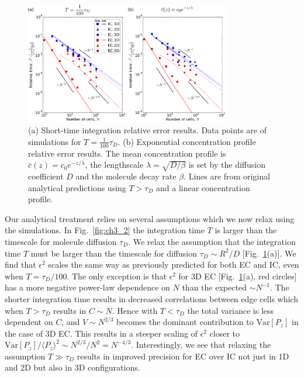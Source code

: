 \begin{figure}[ht]
    \centering
        \includegraphics[width=0.8\textwidth]{../fig/ch3_si1.pdf}
    \caption{(a) Short-time integration relative error results. Data points are of simulations for $T= \frac{1}{100} \tau_D$. (b) Exponential concentration profile relative error results. The mean concentration profile is $\bar{c}(z) = c_0 e^{-z/\lambda}$, the lengthscale $\lambda=\sqrt{D/\beta}$ is set by the diffusion coefficient $D$ and the molecule decay rate $\beta$. Lines are from original analytical predictions using $T > \tau_D$ and a linear concentration profile.} \label{fig:ch3_3}
\end{figure}

Our analytical treatment relies on several assumptions which we now relax using the simulations. In Fig.\ \ref{fig:ch3_2} the integration time $T$ is larger than the timescale for molecule diffusion $\tau_D$.
We relax the assumption that the integration time $T$ must be larger than the timescale for diffusion $\tau_D \sim R^2/D$ [Fig.\ \ref{fig:ch3_3}(a)]. We find that $\epsilon^2$ scales the same way as previously predicted for both EC and IC, even when $T = \tau_D/100$. The only exception is that $\epsilon^2$ for 3D EC [Fig.\ \ref{fig:ch3_3}(a), red circles] has a more negative power-law dependence on $N$ than the expected $\sim N^{-1}$. The shorter integration time results in decreased correlations between edge cells which when $T>\tau_D$ results in $C\sim N$. Hence with
$T < \tau_D$
the total variance is less dependent on $C$, and $V \sim N^{2/3}$ becomes the dominant contribution to $\text{Var}[P_z]$ in the case of 3D EC. This results in a steeper scaling of $\epsilon^2$ closer to
$\text{Var}[P_z]/\langle P_z \rangle^2 \sim N^{2/3}/N^2 = N^{-4/3}$.
Interestingly, we see that relaxing the assumption $T \gg \tau_D$ results in improved precision for EC over IC not just in 1D and 2D but also in 3D configurations.

